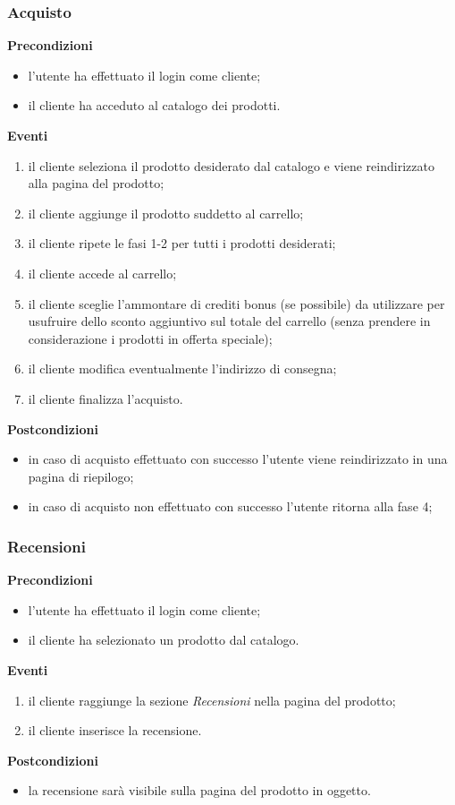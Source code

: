 \documentclass[a4paper, 14pt]{article}
\begin{document}
\begin{flushleft}
			\subsubsection{Acquisto}
			\textbf{Precondizioni}
			\begin{itemize}
				\item l'utente ha effettuato il login come cliente;
				\item il cliente ha acceduto al catalogo dei prodotti.
			\end{itemize}
			\textbf{Eventi}
			\begin{enumerate}
				\item il cliente seleziona il prodotto desiderato dal catalogo e viene reindirizzato alla pagina del prodotto;
				\item il cliente aggiunge il prodotto suddetto al carrello;
				\item il cliente ripete le fasi 1-2 per tutti i prodotti desiderati;
				\item il cliente accede al carrello;
				\item il cliente sceglie l'ammontare di crediti bonus (se possibile) da utilizzare per usufruire dello sconto aggiuntivo
				      sul totale del carrello (senza prendere in considerazione i prodotti in offerta speciale);
				\item il cliente modifica eventualmente l'indirizzo di consegna;
				\item il cliente finalizza l'acquisto.
			\end{enumerate}
			\textbf{Postcondizioni}
			\begin{itemize}
				\item in caso di acquisto effettuato con successo l'utente viene reindirizzato in una pagina di riepilogo;
				\item in caso di acquisto non effettuato con successo l'utente ritorna alla fase 4;
			\end{itemize}
		
			\bigskip
			\subsubsection{Recensioni}
			\textbf{Precondizioni}
			\begin{itemize}
				\item l'utente ha effettuato il login come cliente;
				\item il cliente ha selezionato un prodotto dal catalogo.
			\end{itemize}
			\textbf{Eventi}
			\begin{enumerate}
				\item il cliente raggiunge la sezione \textit{Recensioni} nella pagina del prodotto;
				\item il cliente inserisce la recensione.
			\end{enumerate}
			\textbf{Postcondizioni}
			\begin{itemize}
				\item la recensione sarà visibile sulla pagina del prodotto in oggetto.
			\end{itemize}
			

\end{flushleft}
\end{document}
